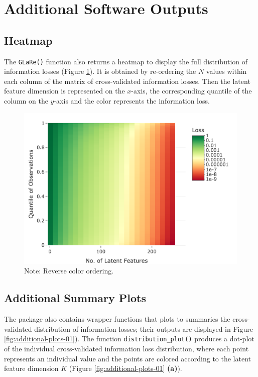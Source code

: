 \section{Additional Software Outputs}\label{sec:additional-outputs}


\subsection{Heatmap}

The \texttt{GLaRe()} function also returns a heatmap to display the full distribution of information losses (Figure \ref{fig:eye-heatmap}).
It is obtained by re-ordering the $N$ values within each column of the matrix of cross-validated information losses.
Then the latent feature dimension is represented on the $x$-axis, the corresponding quantile of the column on the $y$-axis and the color represents the information loss.


\begin{figure}
    \centering
    \includegraphics[width=0.75\linewidth]{figures/eye-heatmap.png}
    \caption{{\color{purple}Note: Reverse color ordering.}}
    \label{fig:eye-heatmap}
\end{figure}

\subsection{Additional Summary Plots}

The  package also contains wrapper functions that plots to summaries the cross-validated distribution of information losses; their outputs are displayed in Figure \ref{fig:additional-plots-01}).
The function \texttt{distribution\_plot()} produces a dot-plot of the individual cross-validated information loss distribution, where each point represents an individual value and the points are colored according to the latent feature dimension $K$ (Figure \ref{fig:additional-plots-01} \textbf{(a)}).

